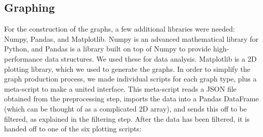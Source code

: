 \documentclass[11pt,journal,compsoc]{IEEEtran} %
\begin{document}
\subsection*{Graphing}
    For the construction of the graphs, a few additional libraries were needed: Numpy, Pandas, and Matplotlib.
    Numpy is an advanced mathematical library for Python, and Pandas is a library built on top of Numpy to provide high-performance data structures.
    We used these for data analysis.
    Matplotlib is a 2D plotting library, which we used to generate the graphs. 
    In order to simplify the graph production process, we made individual scripts for each graph type, plus a meta-script to make a united interface.
    This meta-script reads a JSON file obtained from the preprocessing step, imports the data into a Pandas DataFrame (which can be thought of as a complicated 2D array), and sends this off to be filtered, as explained in the filtering step.
    After the data has been filtered, it is handed off to one of the six plotting scripts:
\end{document}
